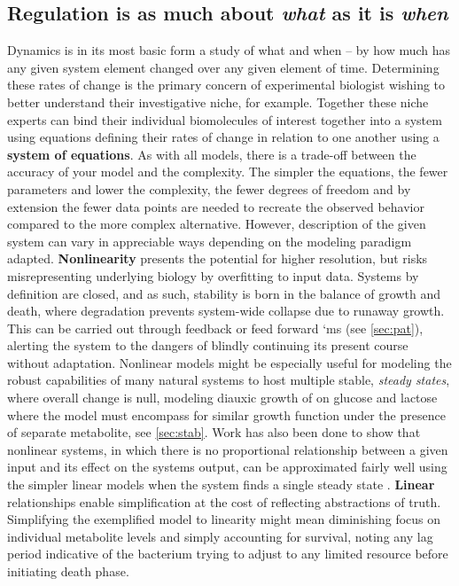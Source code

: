 \subsection{Regulation is as much about \emph{what} as it is \emph{when}}
\label{sec:regwhatwhen}
Dynamics is in its most basic form a study of what and when -- by how much has any given system element changed over any given element of time. Determining these rates of change is the primary concern of experimental biologist wishing to better understand their investigative niche, for example. Together these niche experts can bind their individual biomolecules of interest together into a system using equations defining their rates of change in relation to one another using a \textbf{system of equations}. As with all models, there is a trade-off between the accuracy of your model and the complexity. The simpler the equations, \ie the fewer parameters and lower the complexity, the fewer degrees of freedom and by extension the fewer data points are needed to recreate the observed behavior compared to the more complex alternative. However, description of the given system can vary in appreciable ways depending on the modeling paradigm adapted. 
\textbf{Nonlinearity} presents the potential for higher resolution, but risks misrepresenting underlying biology by overfitting to input data. Systems by definition are closed, and as such, stability is born in the balance of growth and death, where degradation prevents system-wide collapse due to runaway growth\cite{alon2007design}. This can be carried out through feedback or feed forward `ms (see \cref{sec:pat}), alerting the system to the dangers of blindly continuing its present course without adaptation. Nonlinear models might be especially useful for modeling the robust capabilities of many natural systems to host multiple stable, \emph{steady states}, where overall change is null, \eg modeling diauxic growth of \coli on glucose and lactose \cite{wong1997mathematical} where the model must encompass for similar growth function under the presence of separate metabolite, see \cref{sec:stab}. 
Work has also been done to show that nonlinear systems, in which there is no proportional relationship between a given input and its effect on the systems output, can be approximated fairly well using the simpler linear models when the system finds a single steady state \citep{wildenhain2006reconstructing, crampin2006system}.  \textbf{Linear} relationships enable simplification at the cost of reflecting abstractions of truth. Simplifying the exemplified model to linearity might mean diminishing focus on individual metabolite levels and simply accounting for survival, \eg noting any lag period indicative of the bacterium trying to adjust to any limited resource before initiating death phase.


